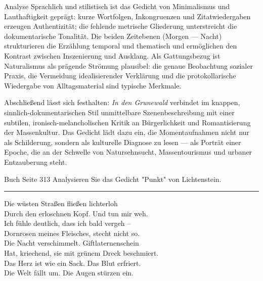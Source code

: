 \documentclass[11pt,a4paper,oneside]{article}
\begin{document}
\begin{loesung}{Analyse}
		Sprachlich und stilistisch ist das Gedicht von Minimalismus und Lauthaftigkeit geprägt: kurze Wortfolgen, Inkongruenzen und Zitatwiedergaben erzeugen Authentizität; die fehlende metrische Gliederung unterstreicht die dokumentarische Tonalität. Die beiden Zeitebenen (Morgen — Nacht) strukturieren die Erzählung temporal und thematisch und ermöglichen den Kontrast zwischen Inszenierung und Ausklang. Als Gattungsbezug ist Naturalismus als prägende Strömung plausibel: die genaue Beobachtung sozialer Praxis, die Vermeidung idealisierender Verklärung und die protokollarische Wiedergabe von Alltagsmaterial sind typische Merkmale.
		
		Abschließend lässt sich festhalten: \textit{In den Grunewald} verbindet im knappen, sinnlich-dokumentarischen Stil unmittelbare Szenenbeschreibung mit einer subtilen, ironisch-melancholischen Kritik an Bürgerlichkeit und Romantisierung der Massenkultur. Das Gedicht lädt dazu ein, die Momentaufnahmen nicht nur als Schilderung, sondern als kulturelle Diagnose zu lesen — als Porträt einer Epoche, die an der Schwelle von Natursehnsucht, Massentourismus und urbaner Entzauberung steht.
	\end{loesung}
	
	\newpage
	
	\begin{aufgabe}{Buch Seite 313}
		Analysieren Sie das Gedicht "Punkt"  von Lichtenstein.\\
		\hrule
		\vspace{5mm}
		Die wüsten Straßen fließen lichterloh\\
		Durch den erloschnen Kopf. Und tun mir weh.\\
		Ich fühle deutlich, dass ich bald vergeh –\\
		Dornrosen meines Fleisches, stecht nicht so.\\
		
		Die Nacht verschimmelt. Giftlaternenschein\\
		Hat, kriechend, sie mit grünem Dreck beschmiert.\\
		Das Herz ist wie ein Sack. Das Blut erfriert.\\
		Die Welt fällt um. Die Augen stürzen ein.\\
	\end{aufgabe}
	
\end{document}
